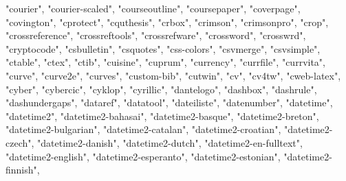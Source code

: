 \documentclass[
]{article}
\newenvironment{Shaded}{\begin{snugshade}}{\end{snugshade}}
\newcommand{\NormalTok}[1]{#1}
\newcommand{\StringTok}[1]{\textcolor[rgb]{0.31,0.60,0.02}{#1}}
\begin{document}
\begin{Shaded}
\begin{Highlighting}[]
\StringTok{"courier"}\NormalTok{, }\StringTok{"courier{-}scaled"}\NormalTok{, }\StringTok{"courseoutline"}\NormalTok{, }\StringTok{"coursepaper"}\NormalTok{, }
\StringTok{"coverpage"}\NormalTok{, }\StringTok{"covington"}\NormalTok{, }\StringTok{"cprotect"}\NormalTok{, }\StringTok{"cquthesis"}\NormalTok{, }\StringTok{"crbox"}\NormalTok{, }\StringTok{"crimson"}\NormalTok{, }
\StringTok{"crimsonpro"}\NormalTok{, }\StringTok{"crop"}\NormalTok{, }\StringTok{"crossreference"}\NormalTok{, }\StringTok{"crossreftools"}\NormalTok{, }\StringTok{"crossrefware"}\NormalTok{, }
\StringTok{"crossword"}\NormalTok{, }\StringTok{"crosswrd"}\NormalTok{, }\StringTok{"cryptocode"}\NormalTok{, }\StringTok{"csbulletin"}\NormalTok{, }\StringTok{"csquotes"}\NormalTok{, }
\StringTok{"css{-}colors"}\NormalTok{, }\StringTok{"csvmerge"}\NormalTok{, }\StringTok{"csvsimple"}\NormalTok{, }\StringTok{"ctable"}\NormalTok{, }\StringTok{"ctex"}\NormalTok{, }\StringTok{"ctib"}\NormalTok{, }
\StringTok{"cuisine"}\NormalTok{, }\StringTok{"cuprum"}\NormalTok{, }\StringTok{"currency"}\NormalTok{, }\StringTok{"currfile"}\NormalTok{, }\StringTok{"currvita"}\NormalTok{, }\StringTok{"curve"}\NormalTok{, }
\StringTok{"curve2e"}\NormalTok{, }\StringTok{"curves"}\NormalTok{, }\StringTok{"custom{-}bib"}\NormalTok{, }\StringTok{"cutwin"}\NormalTok{, }\StringTok{"cv"}\NormalTok{, }\StringTok{"cv4tw"}\NormalTok{, }\StringTok{"cweb{-}latex"}\NormalTok{, }
\StringTok{"cyber"}\NormalTok{, }\StringTok{"cybercic"}\NormalTok{, }\StringTok{"cyklop"}\NormalTok{, }\StringTok{"cyrillic"}\NormalTok{, }\StringTok{"dantelogo"}\NormalTok{, }\StringTok{"dashbox"}\NormalTok{, }
\StringTok{"dashrule"}\NormalTok{, }\StringTok{"dashundergaps"}\NormalTok{, }\StringTok{"dataref"}\NormalTok{, }\StringTok{"datatool"}\NormalTok{, }\StringTok{"dateiliste"}\NormalTok{, }
\StringTok{"datenumber"}\NormalTok{, }\StringTok{"datetime"}\NormalTok{, }\StringTok{"datetime2"}\NormalTok{, }\StringTok{"datetime2{-}bahasai"}\NormalTok{, }\StringTok{"datetime2{-}basque"}\NormalTok{, }
\StringTok{"datetime2{-}breton"}\NormalTok{, }\StringTok{"datetime2{-}bulgarian"}\NormalTok{, }\StringTok{"datetime2{-}catalan"}\NormalTok{, }
\StringTok{"datetime2{-}croatian"}\NormalTok{, }\StringTok{"datetime2{-}czech"}\NormalTok{, }\StringTok{"datetime2{-}danish"}\NormalTok{, }
\StringTok{"datetime2{-}dutch"}\NormalTok{, }\StringTok{"datetime2{-}en{-}fulltext"}\NormalTok{, }\StringTok{"datetime2{-}english"}\NormalTok{, }
\StringTok{"datetime2{-}esperanto"}\NormalTok{, }\StringTok{"datetime2{-}estonian"}\NormalTok{, }\StringTok{"datetime2{-}finnish"}\NormalTok{, }

\end{Highlighting}
\end{Shaded}
\end{document}
